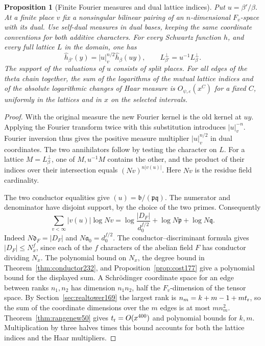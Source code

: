 \documentclass[a4paper,11pt]{article}
\newtheorem{proposition}{Proposition}[section]
\theoremstyle{definition}
\theoremstyle{remark}
\numberwithin{equation}{section}
\begin{document}
\begin{proposition}[Finite Fourier measures and dual lattice indices]
\label{prop:fourier232}
Put \(u=\beta'/\beta\). At a finite place \(v\) fix a nonsingular
bilinear pairing of an \(n\)-dimensional \(F_v\)-space with its dual.
Use self-dual measures in dual bases, keeping the same coordinate
conventions for both additive characters. For every Schwartz function
\(h\), and every full lattice \(L\) in the domain, one has
\[
   \widehat h_{\beta'}(y)=|u|_v^{n/2}\widehat h_\beta(uy),
   \qquad L^\perp_{\beta'}=u^{-1}L^\perp_\beta.
\]
The support of the valuations of \(u\) consists of split places. For
all edges of the theta chain together, the sum of the logarithms of
the mutual lattice indices and of the absolute logarithmic changes
of Haar measure is \(O_{\psi,\varepsilon}(x^C)\) for a fixed \(C\),
uniformly in the lattices and in \(x\) on the selected intervals.
\end{proposition}
\begin{proof}
With the original measure the new Fourier kernel is the old kernel at
\(uy\). Applying the Fourier transform twice with this substitution
introduces \(|u|_v^{-n}\). Fourier inversion thus gives the positive
measure multiplier \(|u|_v^{n/2}\) in dual coordinates. The two
annihilators follow by testing the character on \(L\). For a lattice
\(M=L^\perp_\beta\), one of \(M,u^{-1}M\) contains the other, and
the product of their indices over their intersection equals
\((Nv)^{n|v(u)|}\). Here \(Nv\) is the residue field cardinality.

The two conductor equalities give
\((u)=\mathfrak b/(\mathfrak p\mathfrak q)\). The numerator and
denominator have disjoint support, by the choice of the two primes.
Consequently
\[
 \sum_{v<\infty}|v(u)|\log Nv
 =\log\frac{|D_F|}{d_0^{f/2}}+
              \log N\mathfrak p+\log N\mathfrak q.
\]
Indeed \(N\mathfrak d_F=|D_F|\) and \(N\mathfrak a_0=d_0^{f/2}\).
The conductor--discriminant formula gives \(|D_F|\le N_x^f\), since
each of the \(f\) characters of the abelian field \(F\) has conductor
dividing \(N_x\). The polynomial bound on \(N_x\), the degree bound
in Theorem~\ref{thm:conductor232}, and Proposition~\ref{prop:cost177} give a
polynomial bound for the displayed sum. A Schr\"odinger coordinate
space for an edge between ranks \(n_1,n_2\) has dimension \(n_1n_2\),
half the \(F_v\)-dimension of the tensor space. By
Section~\ref{sec:realtower169} the largest rank is
\(n_m=k+m-1+mt_{\rm r}\), so the sum of the coordinate dimensions
over the \(m\) edges is at most \(mn_m^2\).
Theorem~\ref{thm:rangenew50} gives
\(t_{\rm r}=O(x^{400})\) and polynomial bounds for \(k,m\).
Multiplication by three halves times this bound accounts for both
the lattice indices and the Haar multipliers.
\end{proof}
\end{document}
